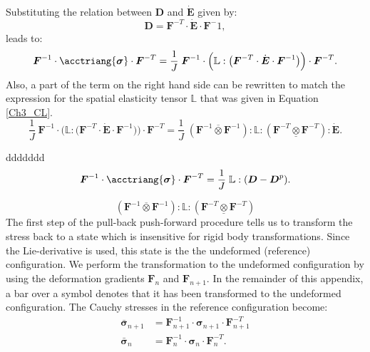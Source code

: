 {{Substituting the relation between $\boldsymbol{D}$ and $\dot{\boldsymbol{E}}$ given by:
\begin{equation}
\boldsymbol{D} = \boldsymbol{F}^{-T}\cdot\dot{\boldsymbol{E}}\cdot\boldsymbol{F}^-1,
\end{equation}
leads to:
\begin{equation}
\boldsymbol{F}^{-1}\cdot\acctriang{\boldsymbol{\sigma}}\cdot\boldsymbol{F}^{-T} = \frac{1}{J}\; \boldsymbol{F}^{-1}\cdot\Big(\boldsymbol{\mathbb L}:\big(\boldsymbol{F}^{-T}\cdot\dot{\boldsymbol{E}}\cdot\boldsymbol{F}^{-1}\big)\Big)\cdot\boldsymbol{F}^{-T}.
\end{equation} 
Also, a part of the term on the right hand side can be rewritten to match the expression for the spatial elasticity tensor $\boldsymbol{\mathbb L}$ that was given in Equation \ref{Ch3_CL}. 
\begin{equation}
\frac{1}{J}\; \boldsymbol{F}^{-1}\cdot\Big(\boldsymbol{\mathbb L}:\big(\boldsymbol{F}^{-T}\cdot\dot{\boldsymbol{E}}\cdot\boldsymbol{F}^{-1}\big)\Big)\cdot\boldsymbol{F}^{-T}= \frac{1}{J}\; (\boldsymbol{F}^{-1}\overline{\otimes}\boldsymbol{F}^{-1}):\boldsymbol{\mathbb L}:(\boldsymbol{F}^{-T}\underline{\otimes}\boldsymbol{F}^{-T}):\dot{\boldsymbol{E}}.
\end{equation}










ddddddd
\vspace{4cm}
\noindent\makebox[\linewidth]{\rule{\paperwidth}{0.4pt}}
\begin{equation}
\boldsymbol{F}^{-1}\cdot\acctriang{\boldsymbol{\sigma}}\cdot\boldsymbol{F}^{-T} = \frac{1}{J}\; \boldsymbol{\mathbb L}:(\boldsymbol{D}-\boldsymbol{D}^p).
\end{equation} 

\begin{equation}
(\boldsymbol{F}^{-1}\overline{\otimes}\boldsymbol{F}^{-1}):\boldsymbol{\mathbb L}:(\boldsymbol{F}^{-T}\underline{\otimes}\boldsymbol{F}^{-T})
\end{equation}
The first step of the pull-back push-forward procedure tells us to transform the stress back to a state which is insensitive for rigid body transformations. Since the Lie-derivative is used, this state is the the undeformed (reference) configuration. We perform the transformation to the undeformed configuration by using the deformation gradients $\boldsymbol{F}_n$ and $\boldsymbol{F}_{n+1}$. In the remainder of this appendix, a bar over a symbol denotes that it has been transformed to the undeformed configuration. The Cauchy stresses in the reference configuration become:
\begin{equation}
\left.\begin{aligned}
\bar{\boldsymbol{\sigma}}_{n+1} &=\boldsymbol{F}_{n+1}^{-1}\cdot\boldsymbol{\sigma}_{n+1}\cdot\boldsymbol{F}_{n+1}^{-T}\\
\bar{\boldsymbol{\sigma}}_{n} &= \boldsymbol{F}^{-1}_{n}\cdot\boldsymbol{\sigma}_{n}\cdot\boldsymbol{F}_{n}^{-T}.
\end{aligned}\right.
\label{Ch3_stressbar}
\end{equation}

}}
